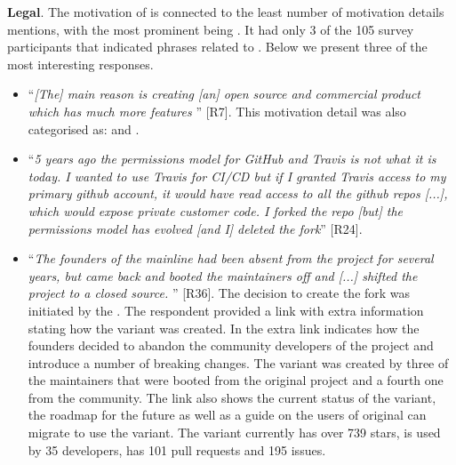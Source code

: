 \nd \textbf{Legal}. The motivation of  is connected to the least number of motivation details mentions, with the most prominent being . It had only 3 of the 105 survey participants that indicated phrases related to . Below we present three of the most interesting responses.

\begin{itemize}[leftmargin=*]
\item ``\emph{[The] main reason is creating [an] open source and commercial product which has much more features%
}'' [R7]. This motivation detail was also categorised as:  and .

\item ``\emph{5 years ago the permissions model for GitHub and Travis is not what it is today. I wanted to use Travis for CI/CD but if I granted Travis access to my primary github account, it would have read access to all the github repos [...], which would expose private customer code. I forked the repo [but] the permissions model has evolved [and I] %
deleted the fork}'' [R24].

\item ``\emph{The founders of the mainline had been absent from the project for several years, but came back and booted the maintainers off and
[...] shifted the project to a closed source. %
}'' [R36]. The decision to create the fork was initiated by the .
The respondent provided a link with extra information stating how the variant was created. In the extra link indicates how the founders decided to abandon the community developers of the project and introduce a number of breaking changes. The variant was created by three of the maintainers that were booted from the original project and a fourth one from the community. The link also shows the current status of the variant, the roadmap for the future as well as a guide on the users of original can migrate to use the variant. The variant currently has over 739 stars, is used by 35 developers, has 101 pull requests and 195 issues.
\end{itemize}


